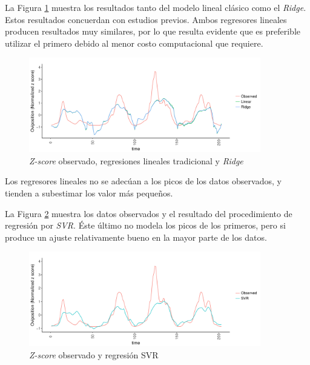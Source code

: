     \par La Figura \ref{fig:ridge_vs_time} muestra los resultados tanto del
      modelo lineal clásico como el \textit{Ridge}. Estos resultados concuerdan
      con estudios previos. Ambos regresores lineales producen resultados muy
      similares, por lo que resulta evidente que es preferible utilizar el
      primero debido al menor costo computacional que requiere.
      \begin{figure}[hbt]
      \centering%
      \includegraphics[width=0.9\textwidth]{images/RidgeVsTime}%
      \caption{\textit{Z-score} observado, regresiones lineales tradicional y
               \textit{Ridge}}\label{fig:ridge_vs_time}
      \end{figure}

    \par Los regresores lineales no se adecúan a los picos de los datos
    observados, y tienden a subestimar los valor más pequeños.

    \par La Figura \ref{fig:svr} muestra los datos observados y el resultado
      del procedimiento de regresión por \textit{SVR}. Éste último no modela los
      picos de los primeros, pero si produce un ajuste relativamente bueno
      en la mayor parte de los datos.
      \begin{figure}[hbt]
      \centering%
      \includegraphics[width=0.9\textwidth]{images/svr}%
      \caption{\textit{Z-score} observado y regresión SVR}\label{fig:svr}
      \end{figure}


